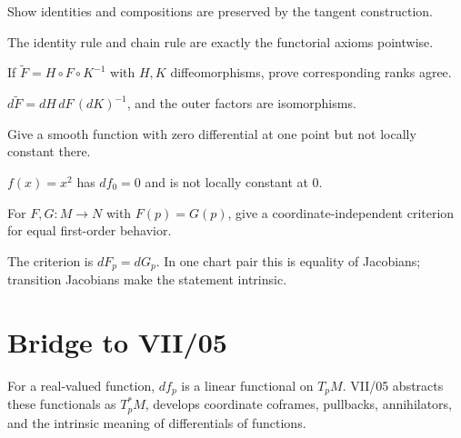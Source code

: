\begin{problem}\label{prob:vii04-ch02}
Show identities and compositions are preserved by the tangent construction.
\end{problem}
\begin{solution}
The identity rule and chain rule are exactly the functorial axioms pointwise.
\end{solution}

\begin{problem}\label{prob:vii04-ch03}
If \(\widetilde F=H\circ F\circ K^{-1}\) with \(H,K\) diffeomorphisms, prove corresponding ranks agree.
\end{problem}
\begin{solution}
\(d\widetilde F=dH\,dF\,(dK)^{-1}\), and the outer factors are isomorphisms.
\end{solution}

\begin{problem}\label{prob:vii04-ch04}
Give a smooth function with zero differential at one point but not locally constant there.
\end{problem}
\begin{solution}
\(f(x)=x^2\) has \(df_0=0\) and is not locally constant at \(0\).
\end{solution}

\begin{problem}\label{prob:vii04-ch05}
For \(F,G:M\to N\) with \(F(p)=G(p)\), give a coordinate-independent criterion for equal first-order behavior.
\end{problem}
\begin{solution}
The criterion is \(dF_p=dG_p\). In one chart pair this is equality of Jacobians; transition Jacobians make the statement intrinsic.
\end{solution}

\section*{Bridge to VII/05}
For a real-valued function, \(df_p\) is a linear functional on \(T_pM\). VII/05 abstracts these functionals as \(T_p^*M\), develops coordinate coframes, pullbacks, annihilators, and the intrinsic meaning of differentials of functions.
